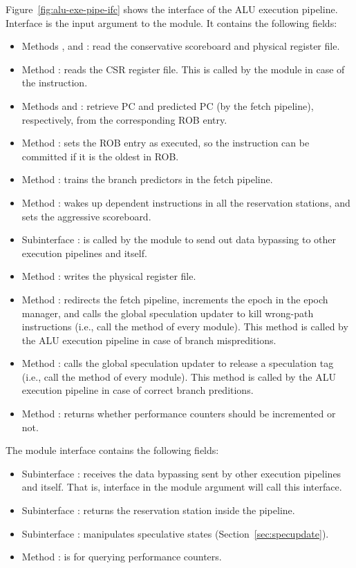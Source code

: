 Figure~\ref{fig:alu-exe-pipe-ifc} shows the interface of the ALU execution pipeline.
Interface  is the input argument to the module.
It contains the following fields:
\begin{itemize}
    \item Methods ,  and : read the conservative scoreboard and physical register file.
    \item Method : reads the CSR register file.
    This is called by the module in case of the  instruction.
    \item Methods  and : retrieve PC and predicted PC (by the fetch pipeline), respectively, from the corresponding ROB entry.
    \item Method : sets the ROB entry as executed, so the instruction can be committed if it is the oldest in ROB.
    \item Method : trains the branch predictors in the fetch pipeline.
    \item Method : wakes up dependent instructions in all the reservation stations, and sets the aggressive scoreboard.
    \item Subinterface : is called by the module to send out data bypassing to other execution pipelines and itself.
    \item Method : writes the physical register file.
    \item Method : redirects the fetch pipeline, increments the epoch in the epoch manager, and calls the global speculation updater to kill wrong-path instructions (i.e., call the  method of every module).
    This method is called by the ALU execution pipeline in case of branch mispreditions.
    \item Method : calls the global speculation updater to release a speculation tag (i.e., call the  method of every module).
    This method is called by the ALU execution pipeline in case of correct branch preditions.
    \item Method : returns whether performance counters should be incremented or not.
\end{itemize}
The module interface  contains the following fields:
\begin{itemize}
    \item Subinterface : receives the data bypassing sent by other execution pipelines and itself.
    That is, interface  in the module argument will call this interface.
    \item Subinterface : returns the reservation station inside the pipeline.
    \item Subinterface : manipulates speculative states (Section~\ref{sec:specupdate}).
    \item Method : is for querying performance counters.
\end{itemize}


